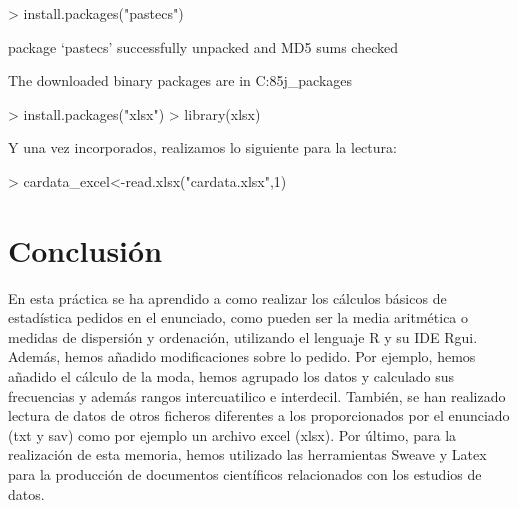 \documentclass [a4paper] {article}
\begin{document}
\begin{Schunk}
\begin{Sinput}
> install.packages("pastecs")
\end{Sinput}
\begin{Soutput}
package ‘pastecs’ successfully unpacked and MD5 sums checked

The downloaded binary packages are in
	C:\Users\Javier\AppData\Local\Temp\RtmpKes85j\downloaded_packages
\end{Soutput}
\begin{Sinput}
> install.packages("xlsx")
> library(xlsx)
\end{Sinput}
\end{Schunk}

Y una vez incorporados, realizamos lo siguiente para la lectura:

\begin{Schunk}
\begin{Sinput}
> cardata_excel<-read.xlsx("cardata.xlsx",1)
\end{Sinput}
\end{Schunk}


\section{Conclusión}
En esta práctica se ha aprendido a como realizar los cálculos básicos de estadística
pedidos en el enunciado, como pueden ser la media aritmética o medidas de dispersión y 
ordenación, utilizando el lenguaje R y su IDE Rgui. Además, hemos añadido 
modificaciones sobre lo pedido. Por ejemplo, hemos añadido el cálculo de la moda,
hemos agrupado los datos y calculado sus frecuencias y además rangos intercuatilico
e interdecil. También, se han realizado lectura de datos de otros ficheros 
diferentes a los proporcionados por el enunciado (txt y sav) como por ejemplo 
un archivo excel (xlsx). Por último, para la realización de esta memoria, 
hemos utilizado las herramientas Sweave y Latex para la producción de documentos 
científicos relacionados con los estudios de datos.
\end{document}
